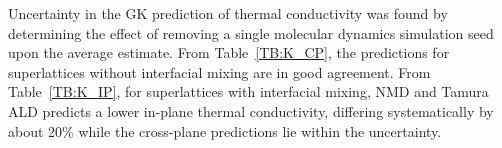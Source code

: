 \documentclass[aps,prb,preprint,preprintnumbers,amsmath,amssymb,floatfix,superscriptaddress]{revtex4}
\begin{document}
Uncertainty in the GK prediction of thermal conductivity was found by determining the effect of removing a single molecular dynamics simulation seed upon the average estimate. From Table~\ref{TB:K_CP}, the predictions for superlattices without interfacial mixing are in good agreement. From Table~\ref{TB:K_IP}, for superlattices with interfacial mixing, NMD and Tamura ALD predicts a lower in-plane thermal conductivity, differing systematically by about 20\% while the cross-plane predictions lie within the uncertainty.
\begin{comment}
\begin{table}
\begin{center}
\begin{tabular}{lcc}
\hline\hline\noalign{\smallskip}
&\multicolumn{2}{c}{Method} \\
\cline{2-3}\noalign{\smallskip}
$k$ & NMD  & GK  \\
\noalign{\smallskip}\hline\noalign{\smallskip}
Cross-Plane Perfect  & 0.24 $\pm$ 0.02 & 0.22 $\pm$ 0.04\\
Cross-Plane 80/20    & 0.17  $\pm$ 0.01   &   0.18 $\pm$ 0.02 \\
Cross-Plane 60/40    & 0.18  $\pm$ 0.01   &   0.19 $\pm$ 0.02 \\
In-Plane Perfect   & 0.52 $\pm$ 0.03 & 0.54 $\pm$ 0.03  \\
In-Plane 80/20  & 0.25 $\pm$ 0.02 & 0.30 $\pm$ 0.01  \\
In-Plane 60/40   & 0.20 $\pm$ 0.02 & 0.26 $\pm$ 0.01  \\
\noalign{\smallskip}\hline\hline
\end{tabular}
\end{center}
\renewcommand{\table}{Table.}
\caption{A comparison of the thermal conductivity predictions [$Wm^{-1}K^{-1}$] predictions for a $4\times4$ superlattice.}
\label{TB:validate}
\end{table}
\end{comment}

%
\end{document}
